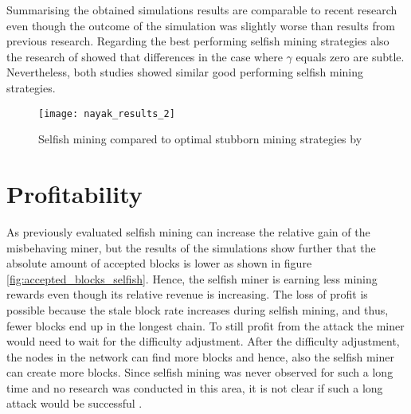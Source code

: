 Summarising the obtained simulations results are comparable to recent research even though the outcome of the simulation was slightly worse than results from previous research.
Regarding the best performing selfish mining strategies also the research of \cite{nayak2016stubborn} showed that differences in the case where $\gamma$ equals zero are subtle.
Nevertheless, both studies showed similar good performing selfish mining strategies.

\begin{figure}[t]
\texttt{[image: nayak\_results\_2]}
\centering
\caption{Selfish mining compared to optimal stubborn mining strategies by \cite{nayak2016stubborn}}
\label{fig:nayak_results_2}
\end{figure}

\section{Profitability}

As previously evaluated selfish mining can increase the relative gain of the misbehaving miner, but the results of the simulations show further that the absolute amount of accepted blocks is lower as shown in figure \ref{fig:accepted_blocks_selfish}.
Hence, the selfish miner is earning less mining rewards even though its relative revenue is increasing.
The loss of profit is possible because the stale block rate increases during selfish mining, and thus, fewer blocks end up in the longest chain.
To still profit from the attack the miner would need to wait for the difficulty adjustment.
After the difficulty adjustment, the nodes in the network can find more blocks and hence, also the selfish miner can create more blocks.
Since selfish mining was never observed for such a long time and no research was conducted in this area, it is not clear if such a long attack would be successful \cite{nayak2016stubborn}.
